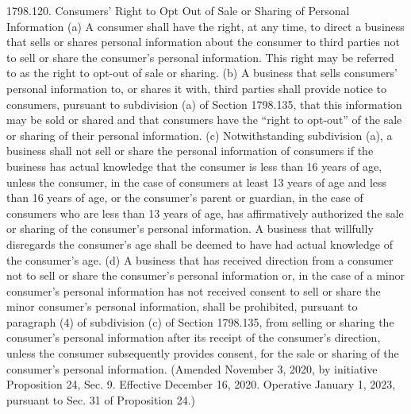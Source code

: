 1798.120.  Consumers’ Right to Opt Out of Sale or Sharing of Personal Information
(a) A consumer shall have the right, at any time, to direct a business that sells or shares personal information about the consumer to third parties not to sell or share the consumer’s personal information. This right may be referred to as the right to opt-out of sale or sharing.
(b) A business that sells consumers’ personal information to, or shares it with, third parties shall provide notice to consumers, pursuant to subdivision (a) of Section 1798.135, that this information may be sold or shared and that consumers have the “right to opt-out” of the sale or sharing of their personal information.
(c) Notwithstanding subdivision (a), a business shall not sell or share the personal information of consumers if the business has actual knowledge that the consumer is less than 16 years of age, unless the consumer, in the case of consumers at least 13 years of age and less than 16 years of age, or the consumer’s parent or guardian, in the case of consumers who are less than 13 years of age, has affirmatively authorized the sale or sharing of the consumer’s personal information. A business that willfully disregards the consumer’s age shall be deemed to have had actual knowledge of the consumer’s age.
(d) A business that has received direction from a consumer not to sell or share the consumer’s personal information or, in the case of a minor consumer’s personal information has not received consent to sell or share the minor consumer’s personal information, shall be prohibited, pursuant to paragraph (4) of subdivision (c) of Section 1798.135, from selling or sharing the consumer’s personal information after its receipt of the consumer’s direction, unless the consumer subsequently provides consent, for the sale or sharing of the consumer’s personal information.
(Amended November 3, 2020, by initiative Proposition 24, Sec. 9. Effective December 16, 2020. Operative January 1, 2023, pursuant to Sec. 31 of Proposition 24.)

